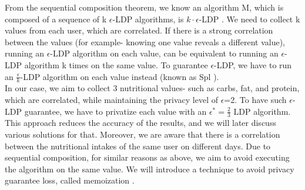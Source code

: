 \documentclass[sigconf]{acmart}
\begin{document}
From the sequential composition theorem, we know an algorithm M, which is composed of a sequence of k $\epsilon$-LDP algorithms, is $k\cdot\epsilon$-LDP \cite{4_arcolezi2022improving}. We need to collect k values from each user, which are correlated. If there is a strong correlation between the values (for example- knowing one value reveals a different value), running an $\epsilon$-LDP algorithm on each value, can be equivalent to running an $\epsilon$-LDP algorithm k times on the same value. To guarantee $\epsilon$-LDP, we have to run an $\frac{\epsilon}{k}$-LDP algorithm on each value instead (known as Spl \cite{4_arcolezi2022improving}).\\
In our case, we aim to collect 3 nutritional values- such as carbs, fat, and protein, which are correlated, while maintaining the privacy level of $\epsilon$=2. To have such $\epsilon$-LDP guarantee, we have to privatize each value with an $\epsilon^*= \frac{2}{3}$ LDP algorithm. This approach reduces the accuracy of the results, and we will later discuss various solutions for that. Moreover, we are aware that there is a correlation between the nutritional intakes of the same user on different days. Due to sequential composition, for similar reasons as above, we aim to avoid executing the algorithm on the same value. We will introduce a technique to avoid privacy guarantee loss, called memoization \cite{2_ding2017collecting}.
\end{document}
